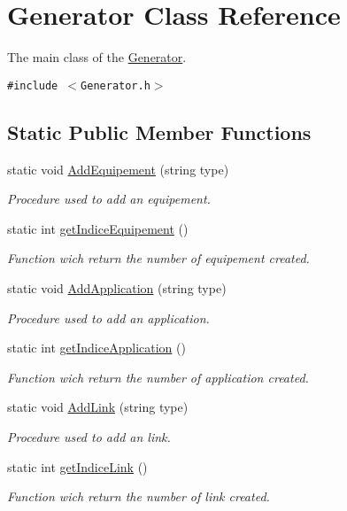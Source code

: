 \hypertarget{class_generator}{
\section{Generator Class Reference}
\label{class_generator}
}
The main class of the \hyperlink{class_generator}{Generator}.  


{\tt \#include $<$Generator.h$>$}

\subsection*{Static Public Member Functions}
\begin{CompactItemize}
\item 
static void \hyperlink{class_generator_f330b00240a5de589a869d76ef88e12e}{AddEquipement} (string type)
\begin{CompactList}\small\item\em Procedure used to add an equipement. \item\end{CompactList}\item 
static int \hyperlink{class_generator_2f74110fbe7f71d94a42414b1b937304}{getIndiceEquipement} ()
\begin{CompactList}\small\item\em Function wich return the number of equipement created. \item\end{CompactList}\item 
static void \hyperlink{class_generator_a8025acf09f21f25e6d49c55b0321569}{AddApplication} (string type)
\begin{CompactList}\small\item\em Procedure used to add an application. \item\end{CompactList}\item 
static int \hyperlink{class_generator_c60abf6cfe238b3df6acd838b08ab1b4}{getIndiceApplication} ()
\begin{CompactList}\small\item\em Function wich return the number of application created. \item\end{CompactList}\item 
static void \hyperlink{class_generator_5868a217747ca891ca481d2b085b0839}{AddLink} (string type)
\begin{CompactList}\small\item\em Procedure used to add an link. \item\end{CompactList}\item 
static int \hyperlink{class_generator_91fabfa6a2d67ec6c502b2c1780dc23b}{getIndiceLink} ()
\begin{CompactList}\small\item\em Function wich return the number of link created. \item\end{CompactList}\end{CompactItemize}
